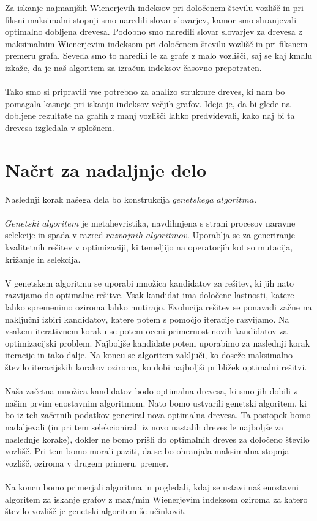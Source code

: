 \documentclass[12pt,a4paper]{amsart}
\theoremstyle{definition} %
\theoremstyle{plain} %
\begin{document}
Za iskanje najmanjših Wienerjevih indeksov pri določenem številu vozlišč in pri fiksni maksimalni stopnji 
smo naredili slovar slovarjev, kamor smo shranjevali optimalno dobljena drevesa. Podobno smo naredili 
slovar slovarjev za drevesa z maksimalnim Wienerjevim indeksom pri določenem številu vozlišč in pri 
fiksnem premeru grafa. Seveda smo to naredili le za grafe z malo vozlišči, saj se kaj kmalu izkaže, da je 
naš algoritem za izračun indeksov časovno prepotraten.
\\
\\
Tako smo si pripravili vse potrebno za analizo strukture dreves, ki nam bo pomagala kasneje pri iskanju 
indeksov večjih grafov. Ideja je, da bi glede na dobljene rezultate na grafih z manj vozlišči lahko predvidevali,
kako naj bi ta drevesa izgledala v splošnem.

\section{Načrt za nadaljnje delo}

Naslednji korak našega dela bo konstrukcija $genetskega$ $algoritma$.
\\
\\
$Genetski$ $algoritem$ je metahevristika, navdihnjena s strani procesov naravne selekcije in spada v razred $razvojnih$
$algoritmov$. Uporablja se za generiranje kvalitetnih rešitev v optimizaciji, ki temeljijo na operatorjih kot so mutacija, križanje
in selekcija.  
\\
\\
V genetskem algoritmu se uporabi množica kandidatov za rešitev, ki jih nato razvijamo do optimalne rešitve. Vsak kandidat
ima določene lastnosti, katere lahko spremenimo oziroma lahko mutirajo. Evolucija rešitev se ponavadi začne na naključni izbiri kandidatov,
katere potem s pomočjo iteracije razvijamo. Na vsakem iterativnem koraku se potem oceni primernost novih kandidatov za optimizacijski
problem. Najboljše kandidate potem uporabimo za naslednji korak iteracije in tako dalje. Na koncu se algoritem zaključi,
ko doseže maksimalno število iteracijskih korakov oziroma, ko dobi najboljši približek optimalni rešitvi.
\\
\\
Naša začetna množica kandidatov bodo optimalna drevesa, ki smo jih dobili z našim prvim enostavnim algoritmom. 
Nato bomo ustvarili genetski algoritem, ki bo iz teh začetnih podatkov generiral nova optimalna drevesa. Ta postopek bomo
nadaljevali (in pri tem selekcionirali iz novo nastalih dreves le najboljše za naslednje korake), dokler ne bomo prišli do optimalnih 
dreves za določeno število vozlišč. Pri tem bomo morali paziti, da se bo ohranjala maksimalna stopnja vozlišč, 
oziroma v drugem primeru, premer. 
\\
\\
Na koncu bomo primerjali algoritma in pogledali, kdaj se ustavi naš enostavni algoritem za iskanje grafov z max/min Wienerjevim indeksom
oziroma za katero število vozlišč je genetski algoritem še učinkovit.
\end{document}
